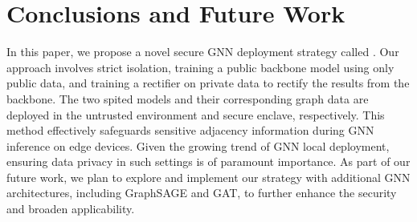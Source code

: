 \section{Conclusions and Future Work} \label{sec: conclusions}
In this paper, we propose a novel secure GNN deployment strategy called \mymethod. 
Our approach involves strict isolation,  training a public backbone model using only public data, and training a rectifier on private data to rectify the results from the backbone. %
The two spited models and their corresponding graph data are deployed in the untrusted environment and secure enclave, respectively. 
This method effectively safeguards sensitive adjacency information during GNN inference on edge devices. 
Given the growing trend of GNN local deployment, ensuring data privacy in such settings is of paramount importance. 
As part of our future work, we plan to explore and implement our strategy with additional GNN architectures, including GraphSAGE and GAT, to further enhance the security and broaden applicability.

